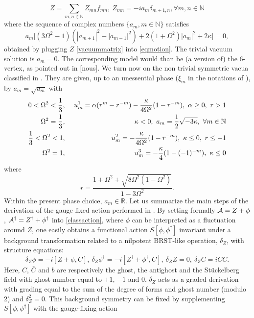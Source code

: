 \documentclass[a4paper]{jpconf}
\numberwithin{equation}{section}
\theoremstyle{nonumberplain}
\begin{document}
\begin{equation}
Z=\sum_{m,n\in\mathbb{N}}Z_{mn}f_{mn},\ Z_{mn}=-ia_{m}\delta_{m+1,n}, \forall m,n\in\mathbb{N}\label{vacuummatrix}
\end{equation}
where  the sequence of complex numbers $\{a_m, m\in\mathbb{N}\}$ satisfies
\begin{equation}
a_m\big[(3\Omega^2-1)(|a_{m+1}|^2+|a_{m-1}|^2)+2(1+\Omega^2)|a_m|^2+2\kappa  \big]=0,\label{recursive}
\end{equation}
obtained by plugging $Z$ \eqref{vacuummatrix} into \eqref{eqmotion}. The trivial vacuum solution is $a_m=0$. The corresponding model would than be (a version of) the 6-vertex, as pointed out in [nous]. We turn now on the non trivial symmetric vacua classified in \cite{GWW2}. They are given, up to an unessential phase ($\xi_m$ in the notations of \cite{GWW2}), by $a_m=\sqrt{u_m}$ with
\begin{eqnarray}
0<\Omega^2<\frac{1}{3}&,&\ u^1_m=\alpha(r^m-r^{-m})-\frac{\kappa}{4\Omega^2}(1-r^{-m}),\ \alpha\ge0,\ r>1\label{vac11}\\
\Omega^2={{1}\over{3}}&,&\ \kappa<0,\ a_m={{1}\over{2}}{\sqrt{ -3\kappa}},\ \forall m\in\mathbb{N}\label{sol1}\\
\frac{1}{3}<\Omega^2<1&,&\ u^2_m=-\frac{\kappa}{4\Omega^2}(1-r^{-m}),\ \kappa\le0,\ r\le-1\label{vac12}\\
\Omega^2=1&,&\ u^3_m=-\frac{\kappa}{4}(1-(-1)^{-m})\label{vac13},\ \kappa\le0
\end{eqnarray}
where
\begin{equation}
r=\frac{1+\Omega^2+\sqrt{8\Omega^2(1-\Omega^2)}}{1-3\Omega^2}\label{err}.
\end{equation}
Within the present phase choice, $a_m\in\mathbb{R}$. Let us summarize the main steps of the derivation of the gauge fixed action performed in \cite{MVW13}. By setting formally ${\cal{A}}=Z+\phi$, ${\cal{A}}^\dag=Z^\dag+\phi^\dag$ into \eqref{classaction}, where $\phi$ can be interpreted as a fluctuation around $Z$, one easily obtains a functional action $S[\phi,\phi^\dag]$ invariant under a background transformation related to a nilpotent BRST-like operation, $\delta_Z$, with structure equations:
\begin{equation}
\delta_Z\phi=-i[Z+\phi,C],\ \delta_Z\phi^\dag=-i[Z^\dag+\phi^\dag,C],\ \delta_ZZ=0,\ \delta_ZC=iCC\label{brsbackgrd}.
\end{equation}
Here, $C$, ${\bar{C}}$ and $b$ are respectively the ghost, the antighost and the St\"uckelberg field with ghost number equal to $+1$, $-1$ and $0$. $\delta_Z$ acts as a graded derivation with grading equal to the sum of the degree of forms and ghost number (modulo 2) and $\delta_Z^2=0$. This background symmetry can be fixed by supplementing $S[\phi,\phi^\dag]$ with the gauge-fixing action
\end{document}
